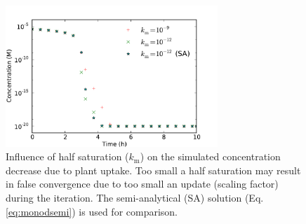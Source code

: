 \documentclass[gmd, manuscript]{copernicus}
\begin{document}
\begin{figure}[t]
\includegraphics[width=8cm]{../figs/fig08/fig08plantntake1.pdf}
\caption{Influence of half saturation ($k_\text{m}$) on the simulated
 concentration decrease due to plant uptake. Too small a half
saturation may result in false convergence due to too small an update (scaling
factor) during the iteration. The semi-analytical (SA) solution (Eq.
\ref{eq:monodsemi}) is used for comparison.}
\label{fig:plantntake}
\end{figure}

\end{document}
